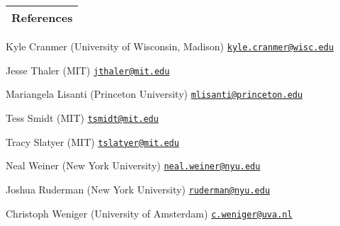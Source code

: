 \documentclass[letterpaper,11pt]{article}
\newenvironment{packed_itemize}{
\begin{itemize}[label=\raisebox{0.25ex}{\tiny$\bullet$}]
  \setlength{\itemsep}{4.2pt}
  \setlength{\parskip}{0pt}
  \setlength{\parsep}{0pt}}{\end{itemize}
}
\begin{document}

\noindent
\begin{tabular*}{\textwidth}{l@{\extracolsep{\fill}}}
\large {\sc \Large{References}}\\
\hline
\end{tabular*}\vspace{1.mm}

\begin{packed_itemize}
  \item Kyle Cranmer (University of Wisconsin, Madison) \hfill \href{mailto:kyle.cranmer@wisc.edu}{\texttt{kyle.cranmer@wisc.edu}}
  \item Jesse Thaler (MIT) \hfill \href{mailto:jthaler@mit.edu}{\texttt{jthaler@mit.edu}}
  \item Mariangela Lisanti (Princeton University) \hfill \href{mailto:mlisanti@princeton.edu}{\texttt{mlisanti@princeton.edu}}
  \item Tess Smidt (MIT) \hfill \href{mailto:tsmidt@mit.edu}{\texttt{tsmidt@mit.edu}}
  \item Tracy Slatyer (MIT) \hfill \href{mailto:tslatyer@mit.edu}{\texttt{tslatyer@mit.edu}}
  \item Neal Weiner (New York University) \hfill \href{mailto:neal.weiner@nyu.edu}{\texttt{neal.weiner@nyu.edu}}
  \item Joshua Ruderman (New York University) \hfill \href{mailto:ruderman@nyu.edu}{\texttt{ruderman@nyu.edu}}
  \item Christoph Weniger (University of Amsterdam) \hfill \href{mailto:c.weniger@uva.nl}{\texttt{c.weniger@uva.nl}}
\end{packed_itemize}


\vspace*{\fill}
\end{document}

